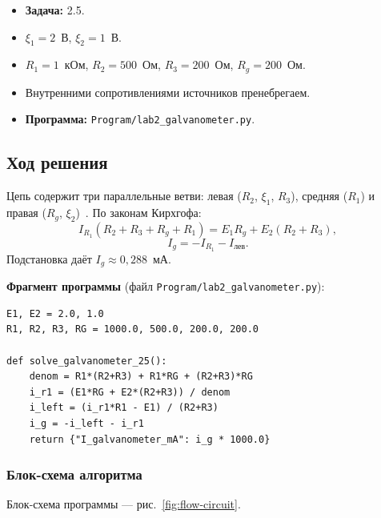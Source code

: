 \documentclass[12pt,a4paper]{scrartcl}
\begin{document}
\begin{itemize}
 \item \textbf{Задача:} 2.5.
 \item $\xi_1=2$~В, $\xi_2=1$~В.
 \item $R_1=1$~кОм, $R_2=500$~Ом, $R_3=200$~Ом, $R_g=200$~Ом.
 \item Внутренними сопротивлениями источников пренебрегаем.
 \item \textbf{Программа:} \texttt{Program/lab2\_galvanometer.py}.
\end{itemize}

\subsection{Ход решения}

Цепь содержит три параллельные ветви: левая ($R_2$, $\xi_1$, $R_3$), средняя ($R_1$) и правая ($R_g$, $\xi_2$)~\cite{Trofimov-2015}. По законам Кирхгофа:
\[
I_{R_1}(R_2+R_3+R_g+R_1)=E_1 R_g + E_2(R_2+R_3),
\]
\[
I_g = -I_{R_1} - I_{\text{лев}}.
\]
Подстановка даёт $I_g\approx 0{,}288$~мА.

\textbf{Фрагмент программы} (файл \texttt{Program/lab2\_galvanometer.py}):
\begin{verbatim}
E1, E2 = 2.0, 1.0
R1, R2, R3, RG = 1000.0, 500.0, 200.0, 200.0

def solve_galvanometer_25():
    denom = R1*(R2+R3) + R1*RG + (R2+R3)*RG
    i_r1 = (E1*RG + E2*(R2+R3)) / denom
    i_left = (i_r1*R1 - E1) / (R2+R3)
    i_g = -i_left - i_r1
    return {"I_galvanometer_mA": i_g * 1000.0}
\end{verbatim}

\subsubsection{Блок-схема алгоритма}

Блок-схема программы --- рис.~\ref{fig:flow-circuit}.
\end{document}
